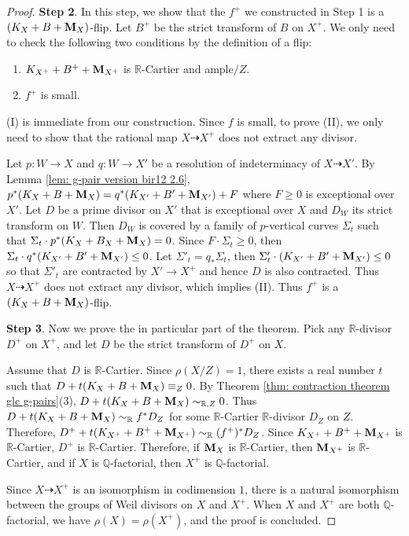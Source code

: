 \documentclass[11pt]{amsart}
\numberwithin{equation}{section}
\newcommand{\Mm}{{\bf{M}}}
\newcommand{\Qq}{\mathbb{Q}}
\newcommand{\Rr}{\mathbb{R}}
\theoremstyle{definition}
\theoremstyle{definition}
\theoremstyle{definition}
\begin{document}
\begin{proof}
\medskip

\noindent\textbf{Step 2}. In this step, we show that the $f^+$ we constructed in Step 1 is a $(K_X+B+\Mm_X)$-flip. Let $B^+$ be the strict transform of $B$ on $X^+$. We only need to check the following two conditions by the definition of a flip:
\begin{enumerate}
\item[(I)] $K_{X^+}+B^++\Mm_{X^+}$ is $\Rr$-Cartier and ample$/Z$.
\item[(II)] $f^+$ is small.
\end{enumerate}
(I) is immediate from our construction. Since $f$ is small, to prove (II), we only need to show that the rational map $X\dashrightarrow X^+$ does not extract any divisor. 

Let $p:W\to X$ and $q:W\to X'$ be a resolution of indeterminacy of $X\dashrightarrow X'$. By Lemma \ref{lem: g-pair version bir12 2.6}, $p^*(K_X+B+\Mm_X)=q^*(K_{X'}+B'+\Mm_{X'})+F$ where $F\geq 0$ is exceptional over $X'$. Let $D$ be a prime divisor on $X'$ that is exceptional over $X$ and $D_W$ its strict transform on $W$. Then $D_W$ is covered by a family of $p$-vertical curves $\Sigma _t$ such that $\Sigma _t\cdot p^*(K_X+B_X+\Mm_X)=0$. Since $F\cdot \Sigma  _t\geq 0$, then $\Sigma _t\cdot q^*(K_{X'}+B'+\Mm_{X'})\leq 0$. 
Let $\Sigma '_t=q_*\Sigma _t$, then $\Sigma ' _t\cdot (K_{X'}+B'+\Mm_{X'})\leq 0$ so that $\Sigma '_t$ are contracted by $X'\to X^+$ and hence $D$ is also contracted. Thus $X\dashrightarrow X^+$ does not extract any divisor, which implies (II). Thus $f^+$ is a $(K_X+B+\Mm_X)$-flip.

\medskip

\noindent\textbf{Step 3}. Now we prove the in particular part of the theorem. Pick any $\Rr$-divisor $D^+$ on $X^+$, and let $D$ be the strict transform of $D^+$ on $X$. 

Assume that $D$ is $\Rr$-Cartier. Since $\rho(X/Z)=1$, there exists a real number $t$ such that $D+t(K_X+B+\Mm_X)\equiv_Z0$. By Theorem \ref{thm: contraction theorem glc g-pairs}(3), $D+t(K_X+B+\Mm_X)\sim_{\Rr,Z}0$. Thus $D+t(K_X+B+\Mm_X)\sim_{\Rr}f^*D_Z$ for some $\Rr$-Cartier $\Rr$-divisor $D_Z$ on $Z$. Therefore, $D^++t(K_{X^+}+B^++\Mm_{X^+})\sim_{\Rr}(f^+)^*D_Z$. Since $K_{X^+}+B^++\Mm_{X^+}$ is $\Rr$-Cartier, $D^+$ is $\Rr$-Cartier.  Therefore, if $\Mm_X$ is $\Rr$-Cartier, then $\Mm_{X^+}$ is $\Rr$-Cartier, and if $X$ is $\Qq$-factorial, then $X^+$ is $\Qq$-factorial.

Since $X\dashrightarrow X^+$ is an isomorphism in codimension $1$, there is a natural isomorphism between the groups of Weil divisors on $X$ and $X^+$. When $X$ and $X^+$ are both $\Qq$-factorial, we have $\rho(X)=\rho(X^+)$, and the proof is concluded.
\end{proof}
\end{document}
